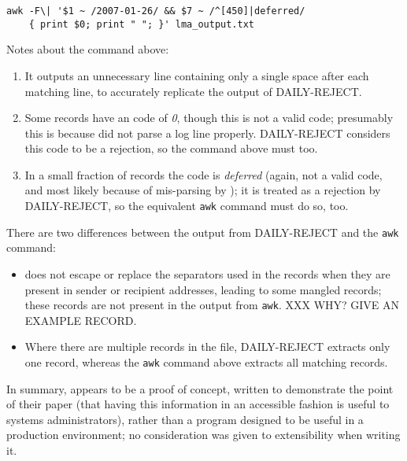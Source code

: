 \begin{verbatim}
awk -F\| '$1 ~ /2007-01-26/ && $7 ~ /^[450]|deferred/
    { print $0; print " "; }' lma_output.txt
\end{verbatim}

Notes about the command above:

\begin{enumerate}

    \item It outputs an unnecessary line containing only a single space
        after each matching line, to accurately replicate the output of
        DAILY-REJECT\@.

    \item Some records have an \SMTP{} code of \textit{0}, though this is
        not a valid \SMTP{} code; presumably this is because \LMA{} did not
        parse a log line properly.  DAILY-REJECT considers this code to be
        a rejection, so the command above must too.

    \item In a small fraction of records the \SMTP{} code is
        \textit{deferred\/} (again, not a valid \SMTP{} code, and most
        likely because of mis-parsing by \LMA{}); it is treated as a
        rejection by DAILY-REJECT, so the equivalent \texttt{awk} command
        must do so, too.

\end{enumerate}

There are two differences between the output from DAILY-REJECT and the
\texttt{awk} command:

\begin{itemize}

    \item \LMA{} does not escape or replace the separators used in the
        \CSV{} records when they are present in sender or recipient
        addresses, leading to some mangled records; these records are not
        present in the output from \texttt{awk}.  XXX WHY\@?  GIVE AN
        EXAMPLE RECORD\@.

    \item Where there are multiple records in the \CSV{} file, DAILY-REJECT
        extracts only one record, whereas the \texttt{awk} command above
        extracts all matching records.

\end{itemize}

In summary, \LMA{} appears to be a proof of concept, written to demonstrate
the point of their paper (that having this information in an accessible
fashion is useful to systems administrators), rather than a program
designed to be useful in a production environment; no consideration was
given to extensibility when writing it.

